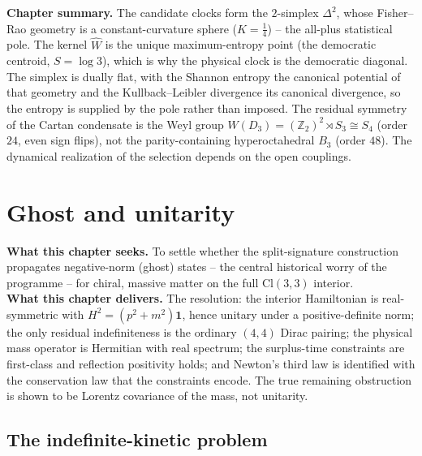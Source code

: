 \documentclass[11pt,oneside]{book}
\newcommand{\Wh}{\hat{W}}                         %
\newcommand{\Cl}{\mathrm{Cl}}                     %
\newcommand{\Zt}{\mathbb{Z}_2}
\theoremstyle{plain}
\theoremstyle{definition}
\theoremstyle{remark}
\begin{document}
\begin{leavesbox}
\textbf{Chapter summary.} The candidate clocks form the $2$-simplex $\Delta^2$,
whose Fisher--Rao geometry is a constant-curvature sphere ($K=\tfrac14$) -- the
all-plus statistical pole. The kernel $\Wh$ is the unique maximum-entropy point
(the democratic centroid, $S=\log3$), which is why the physical clock is the
democratic diagonal. The simplex is dually flat, with the Shannon entropy the
canonical potential of that geometry and the Kullback--Leibler divergence its
canonical divergence, so the entropy is supplied by the pole rather than imposed. The
residual symmetry of the Cartan condensate is the Weyl
group $W(D_3)=(\Zt)^2\rtimes S_3\cong S_4$ (order $24$, even sign flips), not the
parity-containing hyperoctahedral $B_3$ (order $48$). The dynamical realization of
the selection depends on the open couplings.
\end{leavesbox}

\chapter{Ghost and unitarity}
\label{ch:ghost}

\begin{leavesbox}
\textbf{What this chapter seeks.} To settle whether the split-signature
construction propagates negative-norm (ghost) states -- the central historical
worry of the programme -- for chiral, massive matter on the full $\Cl(3,3)$
interior.\\[2pt]
\textbf{What this chapter delivers.} The resolution: the interior Hamiltonian is
real-symmetric with $H^2=(p^2+m^2)\mathbf 1$, hence unitary under a positive-definite
norm; the only residual indefiniteness is the ordinary $(4,4)$ Dirac pairing; the
physical mass operator is Hermitian with real spectrum; the surplus-time
constraints are first-class and reflection positivity holds; and Newton's third law
is identified with the conservation law that the constraints encode. The true
remaining obstruction is shown to be Lorentz covariance of the mass, not unitarity.
\end{leavesbox}

\section{The indefinite-kinetic problem}
\label{sec:ghost-problem}
\end{document}
